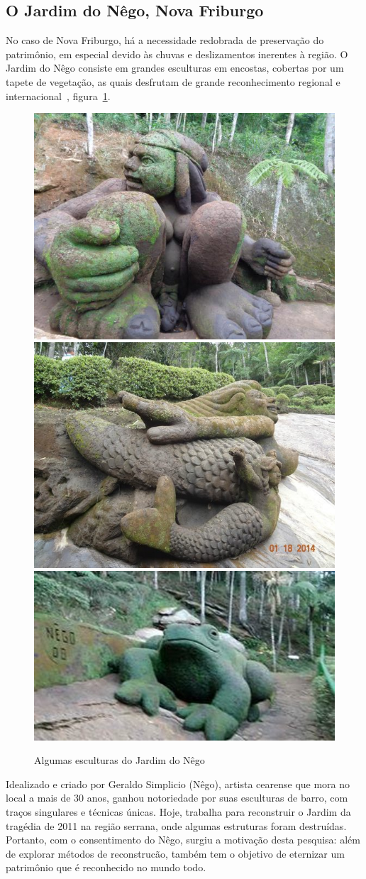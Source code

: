 \subsection{O Jardim do Nêgo, Nova Friburgo}
No caso de Nova Friburgo, há a necessidade redobrada de preservação do
patrimônio, em especial devido às chuvas e deslizamentos inerentes à região.  O
Jardim do Nêgo consiste em grandes esculturas em encostas, cobertas por um tapete de
vegetação, as quais desfrutam de grande reconhecimento regional e internacional~\cite{JardimDoNego:TheGuardian},
figura~\ref{fig:esculturas}.

\begin{figure} [h]
	\centering
	\includegraphics[width=0.3\linewidth]{figs/jardim-do-nego.jpg}
	\includegraphics[width=0.3\linewidth]{figs/jardim-do-nego22.jpg}
	\includegraphics[width=0.35\linewidth]{figs/jardim-do-nego32.jpg}
	\caption{%
	Algumas esculturas do Jardim do Nêgo}\label{fig:esculturas}

\end{figure}

Idealizado e criado por Geraldo Simplicio (Nêgo), artista cearense que mora no 
local a mais de 30 anos, ganhou notoriedade por suas esculturas de barro, com traços 
singulares e técnicas únicas. Hoje, trabalha para reconstruir o Jardim da tragédia de 
2011 na região serrana, onde algumas estruturas foram destruídas. Portanto, com o 
consentimento do Nêgo, surgiu a motivação desta pesquisa: além de explorar métodos de 
reconstrucão, também tem o objetivo de eternizar um patrimônio que é reconhecido no mundo
todo.

